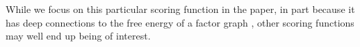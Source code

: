\documentclass[letterpaper]{article} %
\theoremstyle{plain}
\theoremstyle{definition}
\theoremstyle{remark}
\newcommand\Inc{\mathit{Inc}}
\begin{document}
While we focus on this particular scoring function in the paper, 
in part because
it has deep connections to the free energy of a factor graph \cite{KF09},
other scoring functions may well end up being of interest. 
%
        
\end{document}
